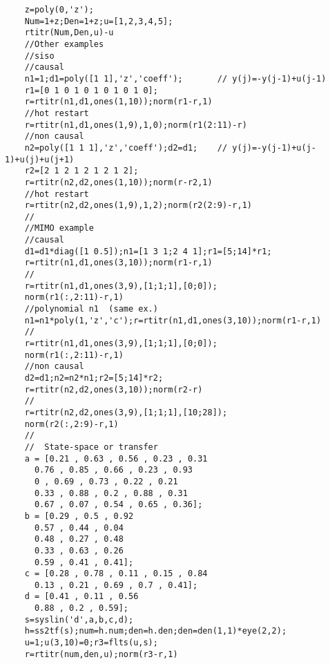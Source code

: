 \begin{examples}
  \begin{Verbatim}
    z=poly(0,'z');
    Num=1+z;Den=1+z;u=[1,2,3,4,5];
    rtitr(Num,Den,u)-u
    //Other examples
    //siso
    //causal
    n1=1;d1=poly([1 1],'z','coeff');       // y(j)=-y(j-1)+u(j-1)
    r1=[0 1 0 1 0 1 0 1 0 1 0];
    r=rtitr(n1,d1,ones(1,10));norm(r1-r,1)
    //hot restart
    r=rtitr(n1,d1,ones(1,9),1,0);norm(r1(2:11)-r)
    //non causal
    n2=poly([1 1 1],'z','coeff');d2=d1;    // y(j)=-y(j-1)+u(j-1)+u(j)+u(j+1)
    r2=[2 1 2 1 2 1 2 1 2];
    r=rtitr(n2,d2,ones(1,10));norm(r-r2,1)
    //hot restart
    r=rtitr(n2,d2,ones(1,9),1,2);norm(r2(2:9)-r,1)
    //
    //MIMO example
    //causal
    d1=d1*diag([1 0.5]);n1=[1 3 1;2 4 1];r1=[5;14]*r1;
    r=rtitr(n1,d1,ones(3,10));norm(r1-r,1)
    //
    r=rtitr(n1,d1,ones(3,9),[1;1;1],[0;0]);
    norm(r1(:,2:11)-r,1)
    //polynomial n1  (same ex.)
    n1=n1*poly(1,'z','c');r=rtitr(n1,d1,ones(3,10));norm(r1-r,1)
    //
    r=rtitr(n1,d1,ones(3,9),[1;1;1],[0;0]);
    norm(r1(:,2:11)-r,1)
    //non causal
    d2=d1;n2=n2*n1;r2=[5;14]*r2;
    r=rtitr(n2,d2,ones(3,10));norm(r2-r)
    //
    r=rtitr(n2,d2,ones(3,9),[1;1;1],[10;28]);
    norm(r2(:,2:9)-r,1)
    //
    //  State-space or transfer
    a = [0.21 , 0.63 , 0.56 , 0.23 , 0.31
      0.76 , 0.85 , 0.66 , 0.23 , 0.93
      0 , 0.69 , 0.73 , 0.22 , 0.21
      0.33 , 0.88 , 0.2 , 0.88 , 0.31
      0.67 , 0.07 , 0.54 , 0.65 , 0.36];
    b = [0.29 , 0.5 , 0.92
      0.57 , 0.44 , 0.04
      0.48 , 0.27 , 0.48
      0.33 , 0.63 , 0.26
      0.59 , 0.41 , 0.41];
    c = [0.28 , 0.78 , 0.11 , 0.15 , 0.84
      0.13 , 0.21 , 0.69 , 0.7 , 0.41];
    d = [0.41 , 0.11 , 0.56
      0.88 , 0.2 , 0.59];
    s=syslin('d',a,b,c,d);
    h=ss2tf(s);num=h.num;den=h.den;den=den(1,1)*eye(2,2);
    u=1;u(3,10)=0;r3=flts(u,s);
    r=rtitr(num,den,u);norm(r3-r,1)
  \end{Verbatim}
\end{examples}
\begin{manseealso}
      
\end{manseealso}
